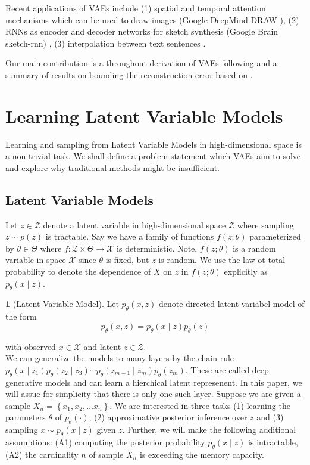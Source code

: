 \documentclass[11pt]{article}
\theoremstyle{plain}
\theoremstyle{definition}
\newtheorem{defn}[thm]{\protect\definitionname}
\theoremstyle{plain}
\providecommand{\definitionname}{Definition}
\begin{document}
Recent applications of VAEs include (1) spatial and temporal attention
mechanisms which can be used to draw images (Google DeepMind DRAW
\cite{icml2015_gregor15}), (2) RNNs as encoder and decoder networks
for sketch synthesis (Google Brain sketch-rnn) \cite{DBLP:journals/corr/HaE17},
(3) interpolation between text sentences \cite{DBLP:journals/corr/BowmanVVDJB15}.

Our main contribution is a throughout derivation of VAEs following
\cite{journals/corr/KingmaW13} and a summary of results on bounding
the reconstruction error based on \cite{doersch2016tutorial}.

\section{Learning Latent Variable Models}

Learning and sampling from Latent Variable Models in high-dimensional
space is a non-trivial task. We shall define a problem statement which
VAEs aim to solve and explore why traditional methods might be insufficient.

\subsection{Latent Variable Models}

Let $z\in\mathcal{Z}$ denote a latent variable in high-dimensional
space $\mathcal{Z}$ where sampling $z\sim p(z)$ is tractable. Say
we have a family of functions $f(z;\theta)$ parameterized by $\theta\in\Theta$
where $f:\mathcal{Z}\times\Theta\rightarrow\mathcal{X}$ is deterministic.
Note, $f(z;\theta)$ is a random variable in space $\mathcal{X}$
since $\theta$ is fixed, but $z$ is random. We use the law ot total
probability to denote the dependence of $X$ on $z$ in $f(z;\theta)$
explicitly as $p_{\theta}(x\mid z)$.
\begin{defn}[Latent Variable Model]
Let $p_{\theta}(x,z)$ denote directed latent-variabel model of the
form
\begin{equation}
p_{\theta}(x,z)=p_{\theta}(x\mid z)p_{\theta}(z)
\end{equation}
\end{defn}
with observed $x\in\mathcal{X}$ and latent $z\in\mathcal{Z}$.\\

\noindent We can generalize the models to many layers by the chain
rule $p_{\theta}(x\mid z_{1})p_{\theta}(z_{2}\mid z_{3})\cdots p_{\theta}(z_{m-1}\mid z_{m})p_{\theta}(z_{m})$.
These are called deep generative models and can learn a hierchical
latent represenent. In this paper, we will assue for simplicity that
there is only one such layer. Suppose we are given a sample $X_{n}=\left\{ x_{1},x_{2},\ldots x_{n}\right\} $.
We are interested in three tasks (1) learning the parameters $\theta$
of $p_{\theta}(\cdot)$, (2) approximative posterior inference over
$z$ and (3) sampling $x\sim p_{\theta}(x\mid z)$ given $z$. Further,
we will make the following additional assumptions: (A1) computing
the posterior probability $p_{\theta}(x\mid z)$ is intractable, (A2)
the cardinality $n$ of sample $X_{n}$ is exceeding the memory capacity.
\end{document}
